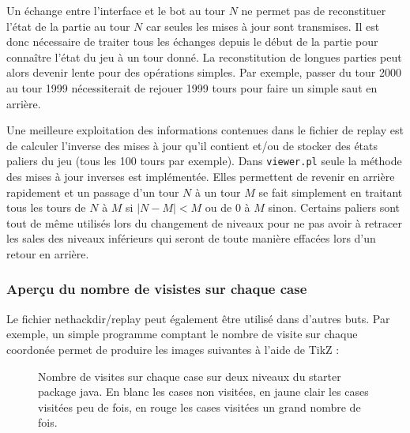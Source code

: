 \documentclass[a4paper,12pt]{article}
\begin{document}
Un échange entre l'interface et le bot au tour $N$ ne permet pas de reconstituer l'état de la partie au tour $N$ car seules les mises à jour sont transmises. Il est donc nécessaire de traiter tous les échanges depuis le début de la partie pour connaître l'état du jeu à un tour donné. La reconstitution de longues parties peut alors devenir lente pour des opérations simples. Par exemple, passer du tour 2000 au tour 1999 nécessiterait de rejouer 1999 tours pour faire un simple saut en arrière.

Une meilleure exploitation des informations contenues dans le fichier de replay est de calculer l'inverse des mises à jour qu'il contient et/ou de stocker des états paliers du jeu (tous les 100 tours par exemple). Dans \verb!viewer.pl! seule la méthode des mises à jour inverses est implémentée. Elles permettent de revenir en arrière rapidement et un passage d'un tour $N$ à un tour $M$ se fait simplement en traitant tous les tours de $N$ à $M$ si $|N-M| < M$ ou de $0$ à $M$ sinon. Certains paliers sont tout de même utilisés lors du changement de niveaux pour ne pas avoir à retracer les sales des niveaux inférieurs qui seront de toute manière effacées lors d'un retour en arrière.

\subsubsection{Aperçu du nombre de visistes sur chaque case}

Le fichier nethackdir/replay peut également être utilisé dans d'autres buts.
Par exemple, un simple programme comptant le nombre de visite sur chaque
coordonée permet de produire les images suivantes à l'aide de TikZ :

\begin{figure}[H]
	\caption{Nombre de visites sur chaque case sur deux niveaux du starter package java. En blanc les cases non visitées, en jaune clair les cases visitées peu de fois, en rouge les cases visitées un grand nombre de fois.}
	\resizebox{\columnwidth}{!}{}
\end{figure}
\end{document}
